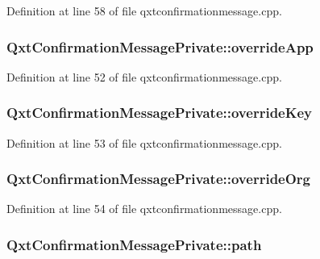 Definition at line 58 of file qxtconfirmationmessage.\-cpp.

\hypertarget{class_qxt_confirmation_message_private_afbb03e49719e3a31401b56eb8808e546}{
\subsubsection[{override\-App}]{ Qxt\-Confirmation\-Message\-Private\-::override\-App}}\label{class_qxt_confirmation_message_private_afbb03e49719e3a31401b56eb8808e546}


Definition at line 52 of file qxtconfirmationmessage.\-cpp.

\hypertarget{class_qxt_confirmation_message_private_a55454a7daaa801ae761aecc645e5402e}{
\subsubsection[{override\-Key}]{ Qxt\-Confirmation\-Message\-Private\-::override\-Key}}\label{class_qxt_confirmation_message_private_a55454a7daaa801ae761aecc645e5402e}


Definition at line 53 of file qxtconfirmationmessage.\-cpp.

\hypertarget{class_qxt_confirmation_message_private_ad52ca1317ac8c76996299eee66773229}{
\subsubsection[{override\-Org}]{ Qxt\-Confirmation\-Message\-Private\-::override\-Org}}\label{class_qxt_confirmation_message_private_ad52ca1317ac8c76996299eee66773229}


Definition at line 54 of file qxtconfirmationmessage.\-cpp.

\hypertarget{class_qxt_confirmation_message_private_aed1c9bb6d5775d542829686af8d7581a}{
\subsubsection[{path}]{ Qxt\-Confirmation\-Message\-Private\-::path\hspace{0.3cm}{\ttfamily [static]}}}\label{class_qxt_confirmation_message_private_aed1c9bb6d5775d542829686af8d7581a}


